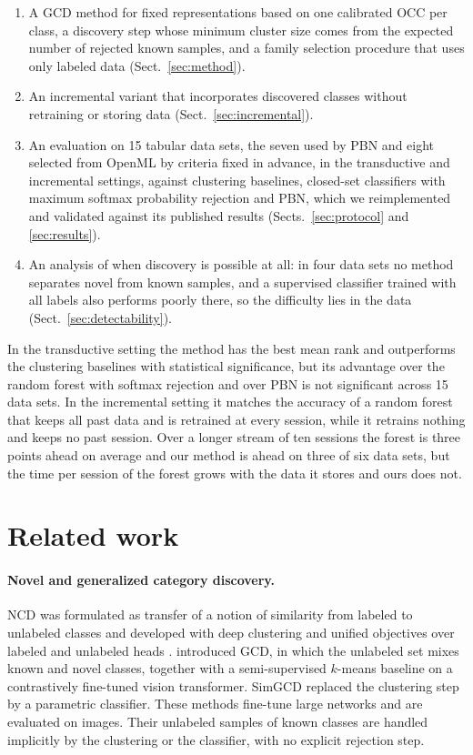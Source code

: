 \documentclass[pdflatex,sn-basic]{sn-jnl}
\begin{document}
\begin{enumerate}
\item A GCD method for fixed representations based on one calibrated OCC per class, a discovery step whose minimum cluster size comes from the expected number of rejected known samples, and a family selection procedure that uses only labeled data (Sect.~\ref{sec:method}).
\item An incremental variant that incorporates discovered classes without retraining or storing data (Sect.~\ref{sec:incremental}).
\item An evaluation on 15 tabular data sets, the seven used by PBN and eight selected from OpenML by criteria fixed in advance, in the transductive and incremental settings, against clustering baselines, closed-set classifiers with maximum softmax probability rejection and PBN, which we reimplemented and validated against its published results (Sects.~\ref{sec:protocol} and \ref{sec:results}).
\item An analysis of when discovery is possible at all: in four data sets no method separates novel from known samples, and a supervised classifier trained with all labels also performs poorly there, so the difficulty lies in the data (Sect.~\ref{sec:detectability}).
\end{enumerate}

In the transductive setting the method has the best mean rank and outperforms the clustering baselines with statistical significance, but its advantage over the random forest with softmax rejection and over PBN is not significant across 15 data sets. In the incremental setting it matches the accuracy of a random forest that keeps all past data and is retrained at every session, while it retrains nothing and keeps no past session. Over a longer stream of ten sessions the forest is three points ahead on average and our method is ahead on three of six data sets, but the time per session of the forest grows with the data it stores and ours does not.

\section{Related work}\label{sec:related}

\paragraph{Novel and generalized category discovery.}
NCD was formulated as transfer of a notion of similarity from labeled to unlabeled classes \citep{hsu2018kcl} and developed with deep clustering \citep{han2019dtc} and unified objectives over labeled and unlabeled heads \citep{fini2021uno}. \citet{vaze2022gcd} introduced GCD, in which the unlabeled set mixes known and novel classes, together with a semi-supervised $k$-means baseline on a contrastively fine-tuned vision transformer. SimGCD \citep{wen2023simgcd} replaced the clustering step by a parametric classifier. These methods fine-tune large networks and are evaluated on images. Their unlabeled samples of known classes are handled implicitly by the clustering or the classifier, with no explicit rejection step.
\end{document}
